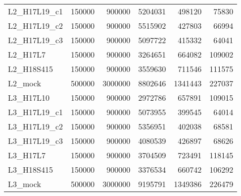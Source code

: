 \begin{tabular}{lrrrrr}
    L2\_H17L19\_c1 &                                   150000 &                             900000 &      5204031 &                  498120 &                   75830 \\
    L2\_H17L19\_c2 &                                   150000 &                             900000 &      5515902 &                  427803 &                   66994 \\
    L2\_H17L19\_c3 &                                   150000 &                             900000 &      5097722 &                  415332 &                   64041 \\
        L2\_H17L7 &                                   150000 &                             900000 &      3264651 &                  664082 &                  109002 \\
      L2\_H18S415 &                                   150000 &                             900000 &      3559630 &                  711546 &                  111575 \\
         L2\_mock &                                   500000 &                            3000000 &      8802646 &                 1341443 &                  227037 \\
       L3\_H17L10 &                                   150000 &                             900000 &      2972786 &                  657891 &                  109015 \\
    L3\_H17L19\_c1 &                                   150000 &                             900000 &      5073955 &                  399545 &                   64014 \\
    L3\_H17L19\_c2 &                                   150000 &                             900000 &      5356951 &                  402038 &                   68581 \\
    L3\_H17L19\_c3 &                                   150000 &                             900000 &      4080539 &                  426897 &                   68626 \\
        L3\_H17L7 &                                   150000 &                             900000 &      3704509 &                  723491 &                  118145 \\
      L3\_H18S415 &                                   150000 &                             900000 &      3376534 &                  660742 &                  106292 \\
         L3\_mock &                                   500000 &                            3000000 &      9195791 &                 1349386 &                  226479 \\
\bottomrule
\end{tabular}
